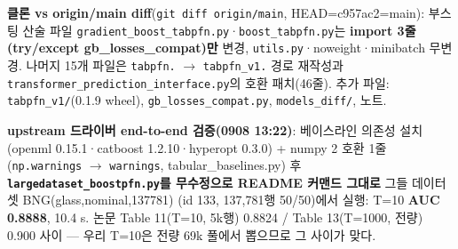 \par\noindent \textbullet\enspace \textbf{클론 vs origin/\allowbreak{}main diff}(\texttt{git diff\allowbreak{} origin/\allowbreak{}\allowbreak{}main}, HEAD=\allowbreak{}c957ac2=\allowbreak{}main): 부스팅 산술 파일 \texttt{gradient\allowbreak{}\_\allowbreak{}\allowbreak{}boost\_\allowbreak{}\allowbreak{}t\allowbreak{}abpfn.\allowbreak{}py\allowbreak{}}·\texttt{boost\_\allowbreak{}\allowbreak{}ta\allowbreak{}bpfn.\allowbreak{}py}는 \textbf{import 3줄(try/\allowbreak{}except gb\_\allowbreak{}losses\_\allowbreak{}compat)만} 변경, \texttt{utils.\allowbreak{}py\allowbreak{}}·noweight·minibatch 무변경. 나머지 15개 파일은 \texttt{tabpfn.\allowbreak{}} \ensuremath{\rightarrow} \texttt{tabpfn\_\allowbreak{}\allowbreak{}v\allowbreak{}1.\allowbreak{}} 경로 재작성과 \texttt{transfor\allowbreak{}mer\_\allowbreak{}\allowbreak{}pred\allowbreak{}iction\_\allowbreak{}\allowbreak{}i\allowbreak{}nterface\allowbreak{}.\allowbreak{}py}의 호환 패치(46줄). 추가 파일: \texttt{tabpfn\_\allowbreak{}\allowbreak{}v\allowbreak{}1/\allowbreak{}\allowbreak{}}(0.1.9 wheel), \texttt{gb\_\allowbreak{}\allowbreak{}losse\allowbreak{}s\_\allowbreak{}\allowbreak{}compat\allowbreak{}.\allowbreak{}py}, \texttt{models\_\allowbreak{}\allowbreak{}d\allowbreak{}iff/\allowbreak{}\allowbreak{}}, 노트.


\par\noindent \textbullet\enspace \textbf{upstream 드라이버 end-to-end 검증(0908 13:22)}: 베이스라인 의존성 설치(openml 0.15.1·catboost 1.2.10·hyperopt 0.3.0) +\allowbreak{} numpy 2 호환 1줄 (\texttt{np.\allowbreak{}warni\allowbreak{}ngs} \ensuremath{\rightarrow} \texttt{warnings\allowbreak{}}, tabular\_\allowbreak{}baselines.py) 후 \textbf{\texttt{largedat\allowbreak{}aset\_\allowbreak{}\allowbreak{}boo\allowbreak{}stpfn.\allowbreak{}py\allowbreak{}}를 무수정으로 README 커맨드 그대로} 그들 데이터셋 BNG(glass,nominal,137781) (id 133, 137,781행 50/\allowbreak{}50)에서 실행: T=\allowbreak{}10 \textbf{AUC 0.8888}, 10.4 s. 논문 Table 11(T=\allowbreak{}10, 5k행) 0.8824 /\allowbreak{} Table 13(T=\allowbreak{}1000, 전량) 0.900 사이 — 우리 T=\allowbreak{}10은 전량 69k 풀에서 뽑으므로 그 사이가 맞다.


